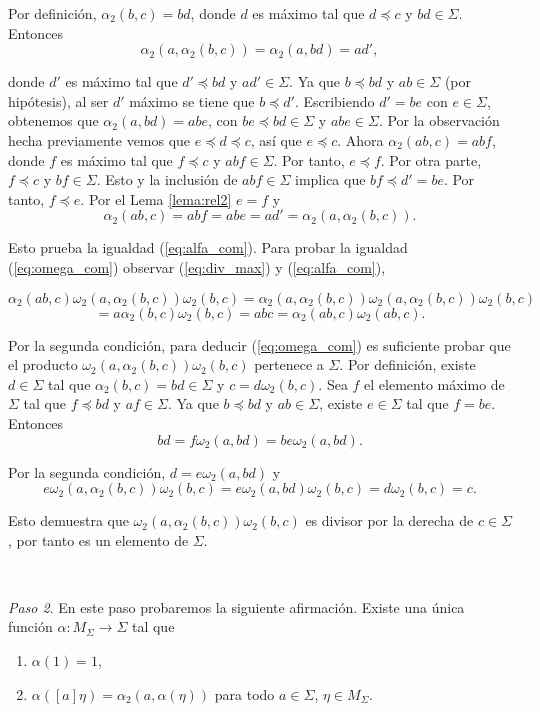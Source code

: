 \documentclass[12pt]{article}
\theoremstyle{definition}
\begin{document}
Por definición, $\alpha_2(b,c)=bd$, donde $d$ es máximo tal que $d\preceq c$ y $bd\in \Sigma$. Entonces
$$\alpha_2(a,\alpha_2(b,c))=\alpha_2(a,bd)=ad',$$

donde $d'$ es máximo tal que $d'\preceq bd$ y $ad'\in\Sigma$. Ya que $b\preceq bd$ y $ab\in\Sigma$ (por hipótesis), al ser $d'$ máximo se tiene que $b\preceq d'$. Escribiendo $d'=be$ con $e\in\Sigma$, obtenemos que $\alpha_2(a,bd)=abe$, con $be\preceq bd\in\Sigma$ y $abe\in\Sigma$. Por la observación hecha previamente vemos que $e\preceq d\preceq c$, así que $e\preceq c$. Ahora $\alpha_2(ab,c)=abf$, donde $f$ es máximo tal que $f\preceq c$ y $abf\in\Sigma$. Por tanto, $e\preceq f$. Por otra parte, $f\preceq c$ y $bf\in\Sigma$. Esto y la inclusión de $abf\in\Sigma$ implica que $bf\preceq d' = be$. Por tanto, $f\preceq e$. Por el Lema \ref{lema:rel2} $e=f$ y
$$\alpha_2(ab,c)=abf=abe=ad'=\alpha_2(a,\alpha_2(b,c)).$$

Esto prueba la igualdad (\ref{eq:alfa_com}). Para probar la igualdad (\ref{eq:omega_com}) observar (\ref{eq:div_max}) y (\ref{eq:alfa_com}),

$$\alpha_2(ab,c)\omega_2(a,\alpha_2(b,c))\omega_2(b,c)=\alpha_2(a,\alpha_2(b,c))\omega_2(a,\alpha_2(b,c))\omega_2(b,c)$$
$$=a\alpha_2(b,c)\omega_2(b,c)=abc=\alpha_2(ab,c)\omega_2(ab,c).$$

Por la segunda condición, para deducir (\ref{eq:omega_com}) es suficiente probar que el producto $\omega_2(a,\alpha_2(b,c))\omega_2(b,c)$ pertenece a $\Sigma$. Por definición, existe $d\in\Sigma$ tal que $\alpha_2(b,c)=bd\in\Sigma$ y $c=d\omega_2(b,c)$. Sea $f$ el elemento máximo de $\Sigma$ tal que $f\preceq bd$ y $af\in\Sigma$. Ya que $b\preceq bd$ y $ab\in\Sigma$, existe $e\in\Sigma$ tal que $f=be$. Entonces
$$bd=f\omega_2(a,bd)=be\omega_2(a,bd).$$

Por la segunda condición, $d=e\omega_2(a,bd)$ y
$$e\omega_2(a,\alpha_2(b,c))\omega_2(b,c)=e\omega_2(a,bd)\omega_2(b,c)=d\omega_2(b,c)=c.$$

Esto demuestra que $\omega_2(a,\alpha_2(b,c))\omega_2(b,c)$ es divisor por la derecha de $c\in\Sigma$, por tanto es un elemento de $\Sigma$.

\ 
 
\textit{Paso 2}. En este paso probaremos la siguiente afirmación. Existe una única función $\alpha:M_\Sigma\rightarrow\Sigma$ tal que

\begin{enumerate}[label=\roman*.]
\item $\alpha(1)=1$,
\item $\alpha([a]\eta)=\alpha_2(a,\alpha(\eta))$ para todo $a\in\Sigma$, $\eta\in M_\Sigma$.
\end{enumerate}
\end{document}
